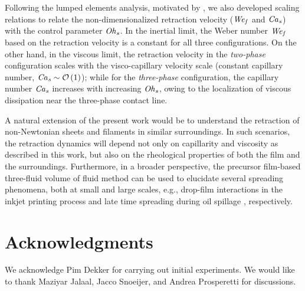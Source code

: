 Following the lumped elements analysis, motivated by \citet{taylor-1959-procrsoclonda, culick-1960-japplphys}, we also developed scaling relations to relate the non-dimensionalized retraction velocity ($\mathit{We}_\mathit{f}$ and $\mathit{Ca}_\mathit{s}$) with the control parameter $\mathit{Oh}_\mathit{s}$. In the inertial limit, the Weber number $\mathit{We}_\mathit{f}$ based on the retraction velocity is a constant for all three configurations. On the other hand, in the viscous limit, the retraction velocity in the \emph{two-phase} configuration scales with the visco-capillary velocity scale (constant capillary number, $\mathit{Ca}_\mathit{s} \sim \mathcal{O}\left(1\right)$); while for the \emph{three-phase} configuration, the capillary number $\mathit{Ca}_\mathit{s}$ increases with increasing $\mathit{Oh}_\mathit{s}$, owing to the localization of viscous dissipation near the three-phase contact line. 

A natural extension of the present work would be to understand the retraction of non-Newtonian sheets and filaments \citep{sen_lohse_2021} in similar surroundings. In such scenarios, the retraction dynamics will depend not only on capillarity and viscosity as described in this work, but also on the rheological properties of both the film and the surroundings. Furthermore, in a broader perspective, the precursor film-based three-fluid volume of fluid method can be used to elucidate several spreading phenomena, both at small and large scales, e.g., drop-film interactions in the inkjet printing process \citep{lohse2022fundamental} and late time spreading during oil spillage \citep{hoult1972oil}, respectively.

\section*{Acknowledgments}
We acknowledge Pim Dekker for carrying out initial experiments. We would like to thank Maziyar Jalaal, Jacco Snoeijer, and Andrea Prosperetti for discussions.

